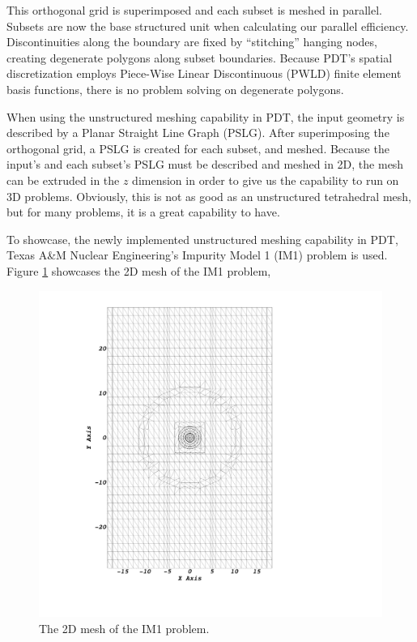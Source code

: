 \documentclass{anstrans}
\begin{document}
This orthogonal grid is superimposed and each subset is meshed in parallel.  Subsets are now the base structured unit when calculating our parallel efficiency. Discontinuities along the boundary are fixed by ``stitching'' hanging nodes, creating degenerate polygons along subset boundaries. Because PDT's spatial discretization employs Piece-Wise Linear Discontinuous (PWLD) finite element basis functions, there is no problem solving on degenerate polygons. 

When using the unstructured meshing capability in PDT, the input geometry is described by a Planar Straight Line Graph (PSLG). After superimposing the orthogonal grid, a PSLG is created for each subset, and meshed. Because the input's and each subset's PSLG must be described and meshed in 2D, the mesh can be extruded in the $z$ dimension in order to give us the capability to run on 3D problems. Obviously, this is not as good as an unstructured tetrahedral mesh, but for many problems, it is a great capability to have. 

To showcase, the newly implemented unstructured meshing capability in PDT, Texas A\&M Nuclear Engineering's Impurity Model 1 (IM1) problem is used. Figure \ref{IM12D} showcases the 2D mesh of the IM1 problem,

\begin{figure}[H]
\centering
\includegraphics[scale = 0.13, trim=28cm  4cm 0cm 4cm,clip]{figures/im12d.png}
\caption{The 2D mesh of the IM1 problem.}
\label{IM12D}
\end{figure}
\end{document}

